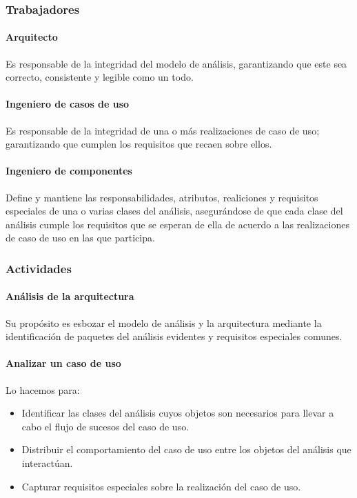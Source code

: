 \subsubsection{Trabajadores}
\paragraph{Arquitecto}
Es responsable de la integridad del modelo de análisis, garantizando que este sea correcto, consistente y legible como un todo.
\paragraph{Ingeniero de casos de uso}
Es responsable de la integridad de una o más realizaciones de caso de uso; garantizando que cumplen los requisitos que recaen sobre ellos.
\paragraph{Ingeniero de componentes}
Define y mantiene las responsabilidades, atributos, realiciones y requisitos especiales de una o varias clases del análisis, asegurándose de que cada clase del análisis cumple los requisitos que se esperan de ella de acuerdo a las realizaciones de caso de uso en las que participa.
\subsubsection{Actividades}
\paragraph{Análisis de la arquitectura}
Su propósito es esbozar el modelo de análisis y la arquitectura mediante la identificación de paquetes del análisis evidentes y requisitos especiales comunes.
\paragraph{Analizar un caso de uso}
Lo hacemos para:
\begin{itemize}
\item Identificar las clases del análisis cuyos objetos son necesarios para llevar a cabo el flujo de sucesos del caso de uso.
\item Distribuir el comportamiento del caso de uso entre los objetos del análisis que interactúan.
\item Capturar requisitos especiales sobre la realización del caso de uso.
\end{itemize}
